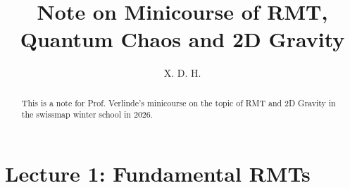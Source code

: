 \documentclass[11pt]{article}
\begin{document}
\title{\boldmath Note on Minicourse of RMT, Quantum Chaos and 2D Gravity}
\author{X. D. H.}

\maketitle

\begin{abstract}
  This is a note for Prof. Verlinde's minicourse on the topic of RMT and 2D Gravity in the swissmap winter school in 2026.
\end{abstract}

\tableofcontents

\section{Lecture 1: Fundamental RMTs}\label{sec:Lecture 1: Fundamental RMTs} %



\printbibliography
\end{document}
